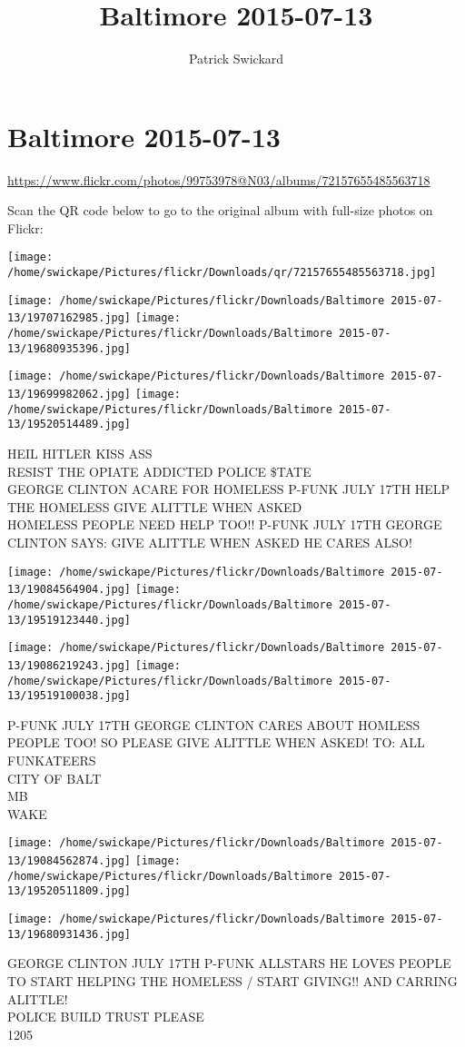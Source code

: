 \documentclass[10pt,letterpaper]{article}
\title{Baltimore 2015-07-13}
\author{Patrick Swickard}
\date{}
\begin{document}
\section*{Baltimore 2015-07-13}

\url{https://www.flickr.com/photos/99753978@N03/albums/72157655485563718}

Scan the QR code below to go to the original album with full-size photos on Flickr:

\texttt{[image: /home/swickape/Pictures/flickr/Downloads/qr/72157655485563718.jpg]}
\pagebreak

\texttt{[image: /home/swickape/Pictures/flickr/Downloads/Baltimore 2015-07-13/19707162985.jpg]}
\texttt{[image: /home/swickape/Pictures/flickr/Downloads/Baltimore 2015-07-13/19680935396.jpg]}

\texttt{[image: /home/swickape/Pictures/flickr/Downloads/Baltimore 2015-07-13/19699982062.jpg]}
\texttt{[image: /home/swickape/Pictures/flickr/Downloads/Baltimore 2015-07-13/19520514489.jpg]}

HEIL HITLER KISS ASS\\
RESIST THE OPIATE ADDICTED POLICE \$TATE\\
GEORGE CLINTON ACARE FOR HOMELESS P{-}FUNK JULY 17TH HELP THE HOMELESS GIVE ALITTLE WHEN ASKED\\
HOMELESS PEOPLE NEED HELP TOO!! P{-}FUNK JULY 17TH GEORGE CLINTON SAYS: GIVE ALITTLE WHEN ASKED HE CARES ALSO!
\pagebreak

\texttt{[image: /home/swickape/Pictures/flickr/Downloads/Baltimore 2015-07-13/19084564904.jpg]}
\texttt{[image: /home/swickape/Pictures/flickr/Downloads/Baltimore 2015-07-13/19519123440.jpg]}

\texttt{[image: /home/swickape/Pictures/flickr/Downloads/Baltimore 2015-07-13/19086219243.jpg]}
\texttt{[image: /home/swickape/Pictures/flickr/Downloads/Baltimore 2015-07-13/19519100038.jpg]}

P{-}FUNK JULY 17TH GEORGE CLINTON CARES ABOUT HOMLESS PEOPLE TOO!  SO PLEASE GIVE ALITTLE WHEN ASKED!  TO: ALL FUNKATEERS\\
CITY OF BALT\\
MB\\
WAKE
\pagebreak

\texttt{[image: /home/swickape/Pictures/flickr/Downloads/Baltimore 2015-07-13/19084562874.jpg]}
\texttt{[image: /home/swickape/Pictures/flickr/Downloads/Baltimore 2015-07-13/19520511809.jpg]}

\texttt{[image: /home/swickape/Pictures/flickr/Downloads/Baltimore 2015-07-13/19680931436.jpg]}

GEORGE CLINTON JULY 17TH P{-}FUNK ALLSTARS HE LOVES PEOPLE TO START HELPING THE HOMELESS / START GIVING!! AND CARRING ALITTLE!\\
POLICE BUILD TRUST PLEASE\\
1205
\pagebreak
\end{document}
